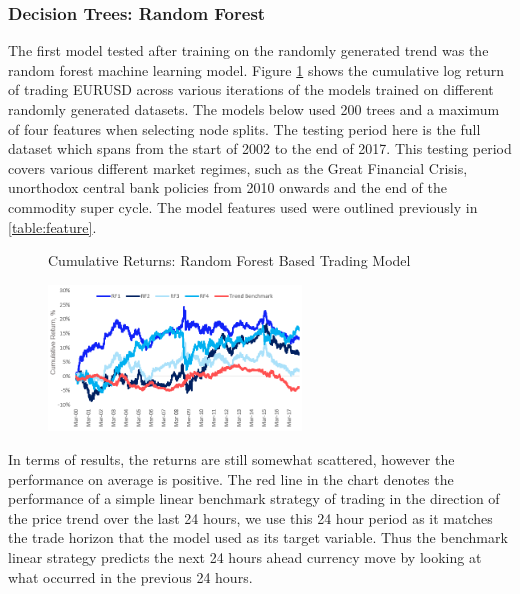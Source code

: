 \documentclass[11pt]{article}
\begin{document}
\subsubsection{Decision Trees: Random Forest}
 The first model tested after training on the randomly generated trend was the random forest machine learning model. Figure \ref{fig:RFRandomDataResults} shows the cumulative log return of trading EURUSD across various iterations of the models trained on different randomly generated datasets. The models below used 200 trees and a maximum of four features when selecting node splits. The testing period here is the full dataset which spans from the start of 2002 to the end of 2017. This testing period covers various different market regimes, such as the Great Financial Crisis, unorthodox central bank policies from 2010 onwards and the end of the commodity super cycle. The model features used were outlined previously in \ref{table:feature}.
\begin{figure}[h]
    \centering
	\caption{Cumulative Returns: Random Forest Based Trading Model}    
	\includegraphics[width=0.6\textwidth]{RFRandomDataResults}
    \label{fig:RFRandomDataResults}
     \caption*{}
\end{figure}
In terms of results, the returns are still somewhat scattered, however the performance on average is positive. The red line in the chart denotes the performance of a simple linear benchmark strategy of trading in the direction of  the price trend over the last 24 hours, we use this 24 hour period as it matches the trade horizon that the model used as its target variable. Thus the benchmark linear strategy predicts the next 24 hours ahead currency move by looking at what occurred in the previous 24 hours.
\end{document}
